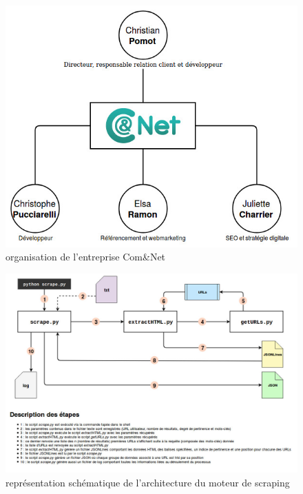\documentclass[12pt]{article}
\begin{document}
\begin{appendices}

\

\

\

\

\

\

\begin{figure}[h]
	\centering\includegraphics[scale=0.65]{Com&Net.jpg}
	\caption{organisation de l'entreprise Com\&Net}
\end{figure}

\begin{figure}[p]
	\centering\includegraphics[scale=0.45]{architectureScraping.jpg}
	\caption{représentation schématique de l'architecture du moteur de scraping}
\end{figure}


\end{appendices}
\end{document}
